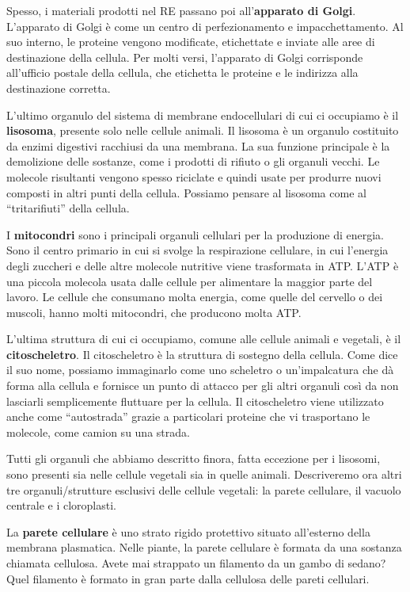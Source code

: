 \documentclass[a4paper]{article}
\begin{document}
Spesso, i materiali prodotti nel RE passano poi all'\textbf{apparato di Golgi}. L'apparato di Golgi è
come un centro di perfezionamento e impacchettamento. Al suo interno, le proteine
vengono modificate, etichettate e inviate alle aree di destinazione della cellula. Per molti
versi, l'apparato di Golgi corrisponde all'ufficio postale della cellula, che etichetta le proteine
e le indirizza alla destinazione corretta.

L'ultimo organulo del sistema di membrane endocellulari di cui ci occupiamo è il \textbf{lisosoma},
presente solo nelle cellule animali. Il lisosoma è un organulo costituito da enzimi digestivi
racchiusi da una membrana. La sua funzione principale è la demolizione delle sostanze,
come i prodotti di rifiuto o gli organuli vecchi. Le molecole risultanti vengono spesso riciclate
e quindi usate per produrre nuovi composti in altri punti della cellula. Possiamo pensare al
lisosoma come al “tritarifiuti” della cellula.

I \textbf{mitocondri} sono i principali organuli cellulari per la produzione di energia. Sono il centro
primario in cui si svolge la respirazione cellulare, in cui l'energia degli zuccheri e delle altre
molecole nutritive viene trasformata in ATP. L'ATP è una piccola molecola usata dalle cellule
per alimentare la maggior parte del lavoro. Le cellule che consumano molta energia, come
quelle del cervello o dei muscoli, hanno molti mitocondri, che producono molta ATP.

L'ultima struttura di cui ci occupiamo, comune alle cellule animali e vegetali, è il
\textbf{citoscheletro}. Il citoscheletro è la struttura di sostegno della cellula. Come dice il suo nome,
possiamo immaginarlo come uno scheletro o un'impalcatura che dà forma alla cellula e
fornisce un punto di attacco per gli altri organuli così da non lasciarli semplicemente fluttuare
per la cellula. Il citoscheletro viene utilizzato anche come “autostrada” grazie a particolari
proteine che vi trasportano le molecole, come camion su una strada.

Tutti gli organuli che abbiamo descritto finora, fatta eccezione per i lisosomi, sono presenti
sia nelle cellule vegetali sia in quelle animali. Descriveremo ora altri tre organuli/strutture
esclusivi delle cellule vegetali: la parete cellulare, il vacuolo centrale e i cloroplasti.

La \textbf{parete cellulare} è uno strato rigido protettivo situato all'esterno della membrana
plasmatica. Nelle piante, la parete cellulare è formata da una sostanza chiamata cellulosa.
Avete mai strappato un filamento da un gambo di sedano? Quel filamento è formato in gran
parte dalla cellulosa delle pareti cellulari.
\end{document}
